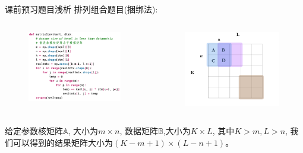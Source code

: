 \documentclass[handout]{beamer}
\begin{document}
\begin{frame}{课前预习题目浅析}
排列组合题目(捆绑法): 
\begin{columns}
	\begin{column}{0.5\textwidth}
	\begin{figure}[H]
		\centering
		\includegraphics[width=0.96\textwidth]{fig/covfun}
	\end{figure}
	\end{column}
	\begin{column}{0.5\textwidth}
	\begin{figure}[H]
		\centering
		\includegraphics[width=0.99\textwidth]{fig/permatrix}
	\end{figure}	
	\end{column}
\end{columns}

给定参数核矩阵$\mathbb{A}$, 大小为$m \times n$, 数据矩阵$\mathbb{B}$,大小为$K \times L$, 其中$K >m, L> n$, 我们可以得到的结果矩阵大小为$(K-m+1) \times (L-n+1)$。
\end{frame}
\end{document}
